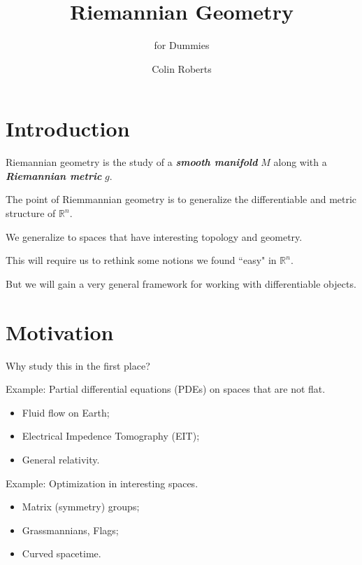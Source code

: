 \documentclass[UKenglish]{beamer}
\author{Colin Roberts}
\title{Riemannian Geometry}
\subtitle{for Dummies}
\newcommand\boldgreen[1]{\textcolor{lighter_csu_green}{\emph{\textbf{#1}}}}
\newcommand{\R}{\mathbb{R}}
\begin{document}
\section{Introduction}

\begin{frame}{}
	\vfill
	\large{Riemannian geometry} is the study of a \boldgreen{smooth manifold} $M$ along with a \boldgreen{Riemannian metric} $g$. 
	\vfill
\end{frame}

\begin{frame}{}
	\vfill
	The point of Riemmannian geometry is to generalize the differentiable and metric structure of $\R^n$.
	\vfill
\end{frame}

\begin{frame}{}
	\vfill
	We generalize to spaces that have interesting topology and geometry.
	\vfill
\end{frame}

\begin{frame}{}
	\vfill
	This will require us to rethink some notions we found ``easy" in $\R^n$.
	\vfill
\end{frame}

\begin{frame}{}
	\vfill
	But we will gain a very general framework for working with differentiable objects.
	\vfill
\end{frame}

\section{Motivation}

\begin{frame}{}
	\vfill
	Why study this in the first place?
	\vfill
\end{frame}

\begin{frame}{}
	\vfill
	Example: Partial differential equations (PDEs) on spaces that are not flat.
	\pause
	\begin{itemize}
		\item Fluid flow on Earth;
		\pause
		\item Electrical Impedence Tomography (EIT);
		\pause
		\item General relativity.
	\end{itemize}
	\vfill
\end{frame}

\begin{frame}{}
	\vfill
	Example: Optimization in interesting spaces.
	\pause
	\begin{itemize}
		\item Matrix (symmetry) groups;
		\pause
		\item Grassmannians, Flags;
		\pause
		\item Curved spacetime.
	\end{itemize}
	\vfill
\end{frame}
\end{document}
